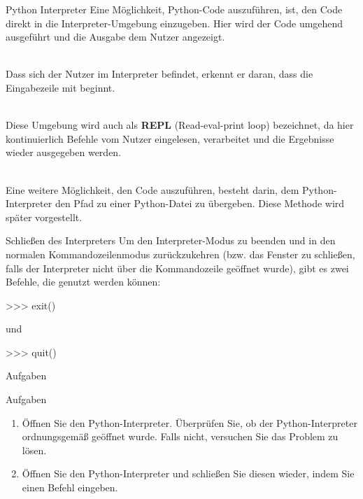     \begin{frame}{Python Interpreter}
        Eine Möglichkeit, Python-Code auszuführen, ist, den Code direkt in die Interpreter-Umgebung einzugeben. Hier wird der Code umgehend ausgeführt und die Ausgabe dem Nutzer angezeigt. \\~\
        
        Dass sich der Nutzer im Interpreter befindet, erkennt er daran, dass die Eingabezeile mit \code{>>>} beginnt. \\~\
        
        Diese Umgebung wird auch als \textbf{REPL} (Read-eval-print loop) bezeichnet, da hier kontinuierlich Befehle vom Nutzer eingelesen, verarbeitet und die Ergebnisse wieder ausgegeben werden. \\~\
        
        Eine weitere Möglichkeit, den Code auszuführen, besteht darin, dem Python-Interpreter den Pfad zu einer Python-Datei zu übergeben. Diese Methode wird später vorgestellt.
    \end{frame}
    
    \begin{frame}[fragile]{Schließen des Interpreters}
        Um den Interpreter-Modus zu beenden und in den normalen Kommandozeilenmodus zurückzukehren (bzw. das Fenster zu schließen, falls der Interpreter nicht über die Kommandozeile geöffnet wurde), gibt es zwei Befehle, die genutzt werden können:
        
\begin{pyconcode}
>>> exit()
\end{pyconcode}

und

\begin{pyconcode}
>>> quit()
\end{pyconcode}
    \end{frame}
    
    
    \begin{subsection}{Aufgaben}
    
        \begin{frame}{Aufgaben}
            \begin{enumerate}
                \item Öffnen Sie den Python-Interpreter. Überprüfen Sie, ob der Python-Interpreter ordnungsgemäß geöffnet wurde. Falls nicht, versuchen Sie das Problem zu lösen.
                
                \item Öffnen Sie den Python-Interpreter und schließen Sie diesen wieder, indem Sie einen Befehl eingeben.
            \end{enumerate}    
        \end{frame}
    
    \end{subsection}